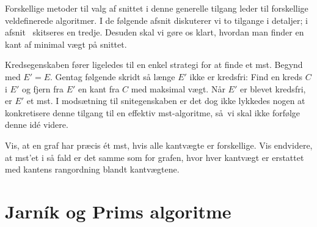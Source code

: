 Forskellige metoder til valg af snittet i denne generelle tilgang  leder til forskellige veldefinerede algoritmer.
I de følgende afsnit diskuterer vi to tilgange i detaljer; i afsnit~ skitseres en tredje. 
Desuden skal vi gøre os klart, hvordan man finder en kant af minimal vægt på snittet.

Kredsegenskaben fører ligeledes til en enkel strategi for at finde et mst.
Begynd med $E'=E$.
Gentag følgende skridt så længe $E'$ ikke er kredsfri:
Find en kreds $C$ i $E'$ og fjern fra $E'$ en kant fra $C$ med maksimal vægt.
Når $E'$ er blevet kredsfri, er $E'$ et mst. 
I modsætning til snitegenskaben er det dog ikke lykkedes nogen at konkretisere denne tilgang til en effektiv mst-algoritme, så vi skal ikke forfølge denne idé videre.

\begin{exerc}
  Vis, at en graf har præcis ét mst, hvis alle kantvægte er forskellige.
  Vis endvidere, at mst’et i så fald er det samme som for grafen, hvor hver kantvægt er erstattet med kantens rangordning blandt kantvægtene.
\end{exerc}


\section{Jarník og Prims algoritme}
%
%
%
%

